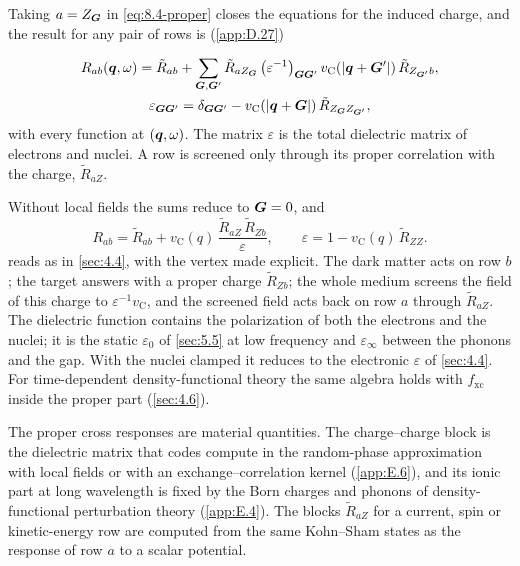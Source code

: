 Taking $a = Z_{\bm{G}}$ in \cref{eq:8.4-proper} closes the equations for the induced charge, and the result for any pair of rows is (\cref{app:D.27})
\begin{keyresult}
\begin{equation}
  \begin{gathered}
  R_{ab}(\bm{q},\omega) = \tilde R_{ab} + \sum_{\bm{G},\bm{G}'}\tilde R_{aZ_{\bm{G}}}\,\bigl(\varepsilon^{-1}\bigr)_{\bm{G}\bm{G}'}\,v_{\mathrm{C}}(|\bm{q}+\bm{G}'|)\,\tilde R_{Z_{\bm{G}'}b} , \\
  \varepsilon_{\bm{G}\bm{G}'} = \delta_{\bm{G}\bm{G}'} - v_{\mathrm{C}}(|\bm{q}+\bm{G}|)\,\tilde R_{Z_{\bm{G}}Z_{\bm{G}'}} ,
  \end{gathered}
  \label{eq:8.4-screened}
\end{equation}
with every function at $(\bm{q},\omega)$. The matrix $\varepsilon$ is the total dielectric matrix of electrons and nuclei. A row is screened only through its proper correlation with the charge, $\tilde R_{aZ}$.
\end{keyresult}
\noindent Without local fields the sums reduce to $\bm{G} = 0$, and
\begin{equation}
  R_{ab} = \tilde R_{ab} + v_{\mathrm{C}}(q)\,\frac{\tilde R_{aZ}\,\tilde R_{Zb}}{\varepsilon} , \qquad \varepsilon = 1 - v_{\mathrm{C}}(q)\,\tilde R_{ZZ} .
  \label{eq:8.4-rank1}
\end{equation}
 reads as in \cref{sec:4.4}, with the vertex made explicit. The dark matter acts on row $b$; the target answers with a proper charge $\tilde R_{Zb}$; the whole medium screens the field of this charge to $\varepsilon^{-1}v_{\mathrm{C}}$, and the screened field acts back on row $a$ through $\tilde R_{aZ}$. The dielectric function contains the polarization of both the electrons and the nuclei; it is the static $\varepsilon_0$ of \cref{sec:5.5} at low frequency and $\varepsilon_\infty$ between the phonons and the gap. With the nuclei clamped it reduces to the electronic $\varepsilon$ of \cref{sec:4.4}. For time-dependent density-functional theory the same algebra holds with $f_{\mathrm{xc}}$ inside the proper part (\cref{sec:4.6}).

The proper cross responses are material quantities. The charge--charge block is the dielectric matrix that codes compute in the random-phase approximation with local fields or with an exchange--correlation kernel (\cref{app:E.6}), and its ionic part at long wavelength is fixed by the Born charges and phonons of density-functional perturbation theory (\cref{app:E.4}). The blocks $\tilde R_{aZ}$ for a current, spin or kinetic-energy row are computed from the same Kohn--Sham states as the response of row $a$ to a scalar potential.

